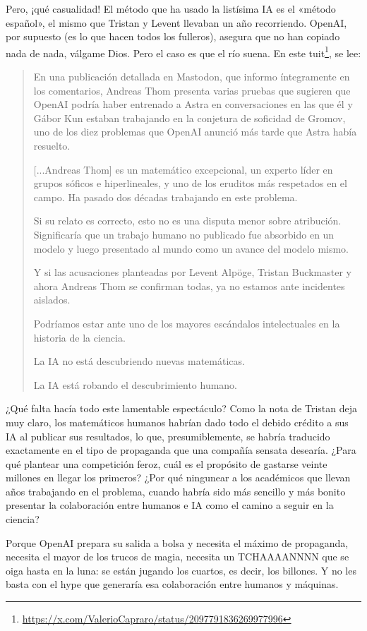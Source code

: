 \documentclass[11pt,a4paper]{article}
\begin{document}
Pero, ¡qué casualidad! El método que ha usado la listísima IA es el «método español», el mismo que Tristan y Levent llevaban un año recorriendo. OpenAI, por supuesto (es lo que hacen todos los fulleros), asegura que no han copiado nada de nada, válgame Dios. Pero el caso es que el río suena. En este tuit\footnote{\url{https://x.com/ValerioCapraro/status/2097791836269977996}}, se lee:
\begin{quotation}
En una publicación detallada en Mastodon, que informo íntegramente en los comentarios, Andreas Thom presenta varias pruebas que sugieren que OpenAI podría haber entrenado a Astra en conversaciones en las que él y Gábor Kun estaban trabajando en la conjetura de soficidad de Gromov, uno de los diez problemas que OpenAI anunció más tarde que Astra había resuelto.

[...Andreas Thom] es un matemático excepcional, un experto líder en grupos sóficos e hiperlineales, y uno de los eruditos más respetados en el campo. Ha pasado dos décadas trabajando en este problema.

Si su relato es correcto, esto no es una disputa menor sobre atribución. Significaría que un trabajo humano no publicado fue absorbido en un modelo y luego presentado al mundo como un avance del modelo mismo.

Y si las acusaciones planteadas por Levent Alpöge, Tristan Buckmaster y ahora Andreas Thom se confirman todas, ya no estamos ante incidentes aislados.

Podríamos estar ante uno de los mayores escándalos intelectuales en la historia de la ciencia.

La IA no está descubriendo nuevas matemáticas.

La IA está robando el descubrimiento humano.
\end{quotation}

¿Qué falta hacía todo este lamentable espectáculo? Como la nota de Tristan deja muy claro, los matemáticos humanos habrían dado todo el debido crédito a sus IA al publicar sus resultados, lo que, presumiblemente, se habría traducido exactamente en el tipo de propaganda que una compañía sensata desearía. ¿Para qué plantear una competición feroz, cuál es el propósito de gastarse veinte millones en llegar los primeros? ¿Por qué ningunear a los académicos que llevan años trabajando en el problema, cuando habría sido más sencillo y más bonito presentar la colaboración entre humanos e IA como el camino a seguir en la ciencia?

Porque OpenAI prepara su salida a bolsa y necesita el máximo de propaganda, necesita el mayor de los trucos de magia, necesita un TCHAAAANNNN que se oiga hasta en la luna: se están jugando los cuartos, es decir, los billones. Y no les basta con el hype que generaría esa colaboración entre humanos y máquinas.
\end{document}
